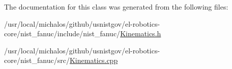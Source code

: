 The documentation for this class was generated from the following files\-:\begin{DoxyCompactItemize}
\item 
/usr/local/michalos/github/usnistgov/el-\/robotics-\/core/nist\-\_\-fanuc/include/nist\-\_\-fanuc/\hyperlink{Kinematics_8h}{Kinematics.\-h}\item 
/usr/local/michalos/github/usnistgov/el-\/robotics-\/core/nist\-\_\-fanuc/src/\hyperlink{Kinematics_8cpp}{Kinematics.\-cpp}\end{DoxyCompactItemize}
